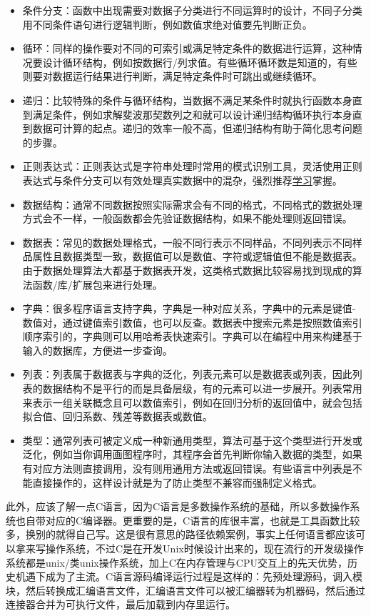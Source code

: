 \documentclass[]{tufte-book}
\begin{document}
\begin{itemize}
\item
  条件分支：函数中出现需要对数据子分类进行不同运算时的设计，不同子分类用不同条件语句进行逻辑判断，例如数值求绝对值要先判断正负。
\item
  循环：同样的操作要对不同的可索引或满足特定条件的数据进行运算，这种情况要设计循环结构，例如按数据行/列求值。有些循环循环数是知道的，有些则要对数据运行结果进行判断，满足特定条件时可跳出或继续循环。
\item
  递归：比较特殊的条件与循环结构，当数据不满足某条件时就执行函数本身直到满足条件，例如求解斐波那契数列之和就可以设计递归结构循环执行本身直到数据可计算的起点。递归的效率一般不高，但递归结构有助于简化思考问题的步骤。
\item
  正则表达式：正则表达式是字符串处理时常用的模式识别工具，灵活使用正则表达式与条件分支可以有效处理真实数据中的混杂，强烈推荐\href{https://zh.wikipedia.org/zh-hans/\%E6\%AD\%A3\%E5\%88\%99\%E8\%A1\%A8\%E8\%BE\%BE\%E5\%BC\%8F}{学习}掌握。
\item
  数据结构：通常不同数据按照实际需求会有不同的格式，不同格式的数据处理方式会不一样，一般函数都会先验证数据结构，如果不能处理则返回错误。
\item
  数据表：常见的数据处理格式，一般不同行表示不同样品，不同列表示不同样品属性且数据类型一致，数据值可以是数值、字符或逻辑值但不能是数据表。由于数据处理算法大都基于数据表开发，这类格式数据比较容易找到现成的算法函数/库/扩展包来进行处理。
\item
  字典：很多程序语言支持字典，字典是一种对应关系，字典中的元素是键值-数值对，通过键值索引数值，也可以反查。数据表中搜索元素是按照数值索引顺序索引的，字典则可以用哈希表快速索引。字典可以在编程中用来构建基于输入的数据库，方便进一步查询。
\item
  列表：列表属于数据表与字典的泛化，列表元素可以是数据表或列表，因此列表的数据结构不是平行的而是具备层级，有的元素可以进一步展开。列表常用来表示一组关联概念且可以数值索引，例如在回归分析的返回值中，就会包括拟合值、回归系数、残差等数据表或数值。
\item
  类型：通常列表可被定义成一种新通用类型，算法可基于这个类型进行开发或泛化，例如当你调用画图程序时，其程序会首先判断你输入数据的类型，如果有对应方法则直接调用，没有则用通用方法或返回错误。有些语言中列表是不能直接操作的，这样设计就是为了防止类型不兼容而强制定义格式。
\end{itemize}

此外，应该了解一点C语言，因为C语言是多数操作系统的基础，所以多数操作系统也自带对应的C编译器。更重要的是，C语言的库很丰富，也就是工具函数比较多，换别的就得自己写。这是很有意思的路径依赖案例，事实上任何语言都应该可以拿来写操作系统，不过C是在开发Unix时候设计出来的，现在流行的开发级操作系统都是unix/类unix操作系统，加上C在内存管理与CPU交互上的先天优势，历史机遇下成为了主流。C语言源码编译运行过程是这样的：先预处理源码，调入模块，然后转换成汇编语言文件，汇编语言文件可以被汇编器转为机器码，然后通过连接器合并为可执行文件，最后加载到内存里运行。
\end{document}
